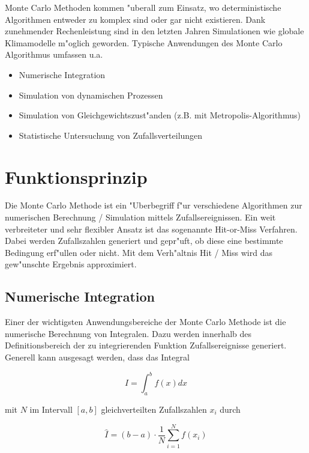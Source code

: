 \begin{refsection}
Monte Carlo Methoden kommen "uberall zum Einsatz, wo deterministische
Algorithmen entweder zu komplex sind oder gar nicht existieren. Dank
zunehmender Rechenleistung sind in den letzten Jahren Simulationen wie
globale Klimamodelle m"oglich geworden. Typische Anwendungen des Monte
Carlo Algorithmus umfassen u.a.

\begin{itemize}
\item Numerische Integration
\item Simulation von dynamischen Prozessen
\item Simulation von Gleichgewichtszust"anden (z.B. mit Metropolis-Algorithmus)
\item Statistische Untersuchung von Zufallsverteilungen
\end{itemize}

\section{Funktionsprinzip}
Die Monte Carlo Methode ist ein "Uberbegriff f"ur verschiedene Algorithmen
zur numerischen Berechnung / Simulation mittels Zufallsereignissen. Ein
weit verbreiteter und sehr flexibler Ansatz ist das sogenannte Hit-or-Miss
Verfahren. Dabei werden Zufallszahlen generiert und gepr"uft, ob diese
eine bestimmte Bedingung erf"ullen oder nicht. Mit dem Verh"altnis Hit /
Miss wird das gew"unschte Ergebnis approximiert.

\subsection{Numerische Integration} \label{subsec:numIntegration}
Einer der wichtigsten Anwendungsbereiche der Monte Carlo Methode ist
die numerische Berechnung von Integralen. Dazu werden innerhalb des
Definitionsbereich der zu integrierenden Funktion Zufallsereignisse
generiert. Generell kann ausgesagt werden, dass das Integral

\begin{equation}
	I = \int_a^b f(x) dx
\end{equation} 

mit $N$ im Intervall $[a,b]$ gleichverteilten Zufallszahlen $x_i$ durch

\begin{equation}
	\hat{I} = (b-a) \cdot \frac{1}{N} \sum_{i=1}^{N} f(x_i)
\end{equation}


\end{refsection}
